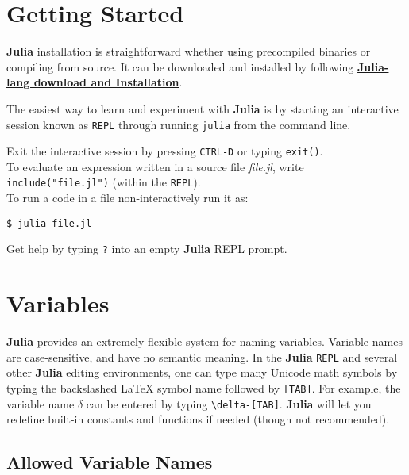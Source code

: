\documentclass[
]{article}
\begin{document}
\newpage

\hypertarget{getting-started}{%
\section{Getting Started}\label{getting-started}}

\textbf{Julia} installation is straightforward whether using precompiled
binaries or compiling from source. It can be downloaded and installed by
following \href{https://julialang.org/downloads/}{\textbf{Julia-lang download
and Installation}}.

The easiest way to learn and experiment with \textbf{Julia} is by
starting an interactive session known as \texttt{REPL} through running
\texttt{julia} from the command line.

Exit the interactive session by pressing \texttt{CTRL-D} or typing
\texttt{exit()}.\\
To evaluate an expression written in a source file \emph{file.jl}, write
\texttt{include("file.jl")} (within the \texttt{REPL}).\\
To run a code in a file non-interactively run it as:

\begin{verbatim}
$ julia file.jl
\end{verbatim}

Get help by typing \texttt{?} into an empty \textbf{Julia} REPL prompt.

\newpage

\hypertarget{variables}{%
\section{Variables}\label{variables}}

\textbf{Julia} provides an extremely flexible system for naming
variables. Variable names are case-sensitive, and have no semantic
meaning. In the \textbf{Julia} \texttt{REPL} and several other
\textbf{Julia} editing environments, one can type many Unicode math
symbols by typing the backslashed \LaTeX{} symbol name followed by
\texttt{{[}TAB{]}}. For example, the variable name \(\delta\) can be
entered by typing \texttt{\textbackslash{}delta-{[}TAB{]}}. \textbf{Julia}
will let you redefine built-in constants and functions if needed (though
not recommended).

\hypertarget{allowed-variable-names}{%
\subsection{Allowed Variable Names}\label{allowed-variable-names}}
\end{document}
